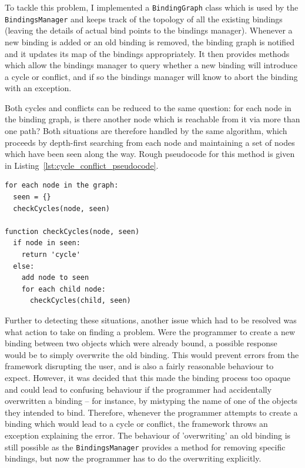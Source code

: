\documentclass[12pt,twoside,notitlepage]{report}
\begin{document}
To tackle this problem, I implemented a \texttt{BindingGraph} class which is used by the \texttt{BindingsManager} and keeps track of the topology of all the existing bindings (leaving the details of actual bind points to the bindings manager). Whenever a new binding is added or an old binding is removed, the binding graph is notified and it updates its map of the bindings appropriately. It then provides methods which allow the bindings manager to query whether a new binding will introduce a cycle or conflict, and if so the bindings manager will know to abort the binding with an exception.

Both cycles and conflicts can be reduced to the same question: for each node in the binding graph, is there another node which is reachable from it via more than one path? Both situations are therefore handled by the same algorithm, which proceeds by depth-first searching from each node and maintaining a set of nodes which have been seen along the way. Rough pseudocode for this method is given in Listing~\ref{lst:cycle_conflict_pseudocode}.

\begin{lstlisting}[caption={Pseudocode for cycle and conflict detection}, label=lst:cycle_conflict_pseudocode]
for each node in the graph:
  seen = {}
  checkCycles(node, seen)

function checkCycles(node, seen)
  if node in seen:
    return 'cycle'
  else:
    add node to seen
    for each child node:
      checkCycles(child, seen)
\end{lstlisting}

Further to detecting these situations, another issue which had to be resolved was what action to take on finding a problem. Were the programmer to create a new binding between two objects which were already bound, a possible response would be to simply overwrite the old binding. This would prevent errors from the framework disrupting the user, and is also a fairly reasonable behaviour to expect. However, it was decided that this made the binding process too opaque and could lead to confusing behaviour if the programmer had accidentally overwritten a binding -- for instance, by mistyping the name of one of the objects they intended to bind. Therefore, whenever the programmer attempts to create a binding which would lead to a cycle or conflict, the framework throws an exception explaining the error. The behaviour of 'overwriting' an old binding is still possible as the \texttt{BindingsManager} provides a method for removing specific bindings, but now the programmer has to do the overwriting explicitly.
\end{document}
